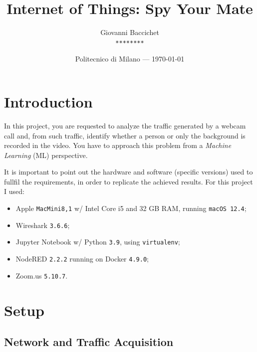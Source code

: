 \documentclass{article}
\title{Internet of Things: Spy Your Mate} %
\author{Giovanni Baccichet\\ \raisebox{0.1\height}{\fontsize{8}{8}\faUser} \texttt{********}} %
\date{Politecnico di Milano --- \today} %
\begin{document}
\maketitle %


\section{Introduction} %

In this project, you are requested to analyze the traffic generated by a webcam call and, from such traffic, identify whether a person or only the background is recorded in the video. You have to approach this problem from a \textit{Machine Learning} (ML) perspective.

\begin{warn}
	It is important to point out the hardware and software (specific versions) used to fullfil the requirements, in order to replicate the achieved results. For this project I used:
	\begin{itemize}
		\item Apple \texttt{MacMini8,1} w/ Intel Core i5 and 32 GB RAM, running \texttt{macOS 12.4};
		\item Wireshark \texttt{3.6.6};
		\item Jupyter Notebook w/ Python \texttt{3.9}, using \texttt{virtualenv};
		\item NodeRED \texttt{2.2.2} running on Docker \texttt{4.9.0};
		\item Zoom.us \texttt{5.10.7}.
	\end{itemize}
\end{warn}


\section{Setup}

\subsection{Network and Traffic Acquisition} %
\end{document}
